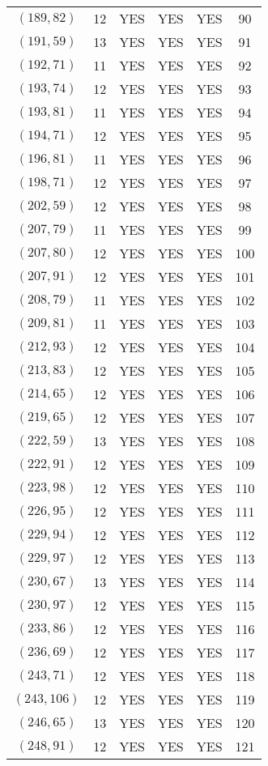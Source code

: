 \begin{longtable}{|c|c|c|c|c|c|}
$(189, 82)$ & 12 & YES & YES & YES & 90\\
$(191, 59)$ & 13 & YES & YES & YES & 91\\
$(192, 71)$ & 11 & YES & YES & YES & 92\\
$(193, 74)$ & 12 & YES & YES & YES & 93\\
$(193, 81)$ & 11 & YES & YES & YES & 94\\
$(194, 71)$ & 12 & YES & YES & YES & 95\\
$(196, 81)$ & 11 & YES & YES & YES & 96\\
$(198, 71)$ & 12 & YES & YES & YES & 97\\
$(202, 59)$ & 12 & YES & YES & YES & 98\\
$(207, 79)$ & 11 & YES & YES & YES & 99\\
$(207, 80)$ & 12 & YES & YES & YES & 100\\
$(207, 91)$ & 12 & YES & YES & YES & 101\\
$(208, 79)$ & 11 & YES & YES & YES & 102\\
$(209, 81)$ & 11 & YES & YES & YES & 103\\
$(212, 93)$ & 12 & YES & YES & YES & 104\\
$(213, 83)$ & 12 & YES & YES & YES & 105\\
$(214, 65)$ & 12 & YES & YES & YES & 106\\
$(219, 65)$ & 12 & YES & YES & YES & 107\\
$(222, 59)$ & 13 & YES & YES & YES & 108\\
$(222, 91)$ & 12 & YES & YES & YES & 109\\
$(223, 98)$ & 12 & YES & YES & YES & 110\\
$(226, 95)$ & 12 & YES & YES & YES & 111\\
$(229, 94)$ & 12 & YES & YES & YES & 112\\
$(229, 97)$ & 12 & YES & YES & YES & 113\\
$(230, 67)$ & 13 & YES & YES & YES & 114\\
$(230, 97)$ & 12 & YES & YES & YES & 115\\
$(233, 86)$ & 12 & YES & YES & YES & 116\\
$(236, 69)$ & 12 & YES & YES & YES & 117\\
$(243, 71)$ & 12 & YES & YES & YES & 118\\
$(243, 106)$ & 12 & YES & YES & YES & 119\\
$(246, 65)$ & 13 & YES & YES & YES & 120\\
$(248, 91)$ & 12 & YES & YES & YES & 121\\

\end{longtable}
